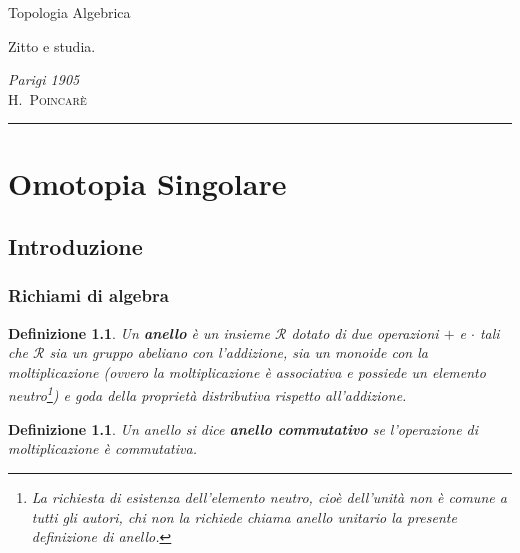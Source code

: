 \documentclass[10pt, twoside=false, x11names]{scrbook}
\newtheorem{definition}[theorem]{Definizione}
\newcommand{\R}{\mathcal{R}}
\begin{document}
\begin{titlepage}

\noindent
\titlefont Topologia Algebrica
\epigraph{Zitto e studia.}%
{\textit{Parigi 1905}\\ \textsc{H.\ Poincarè}}
\null\vfill
\vspace*{1cm}
\noindent
\hfill
\begin{minipage}{0.35\linewidth}
    \begin{flushright}
        \printauthor
    \end{flushright}
\end{minipage}
%
\begin{minipage}{0.02\linewidth}
    \rule{1pt}{125pt}
\end{minipage}
\titlepagedecoration
\end{titlepage}

\tableofcontents
\printsymblist


\chapter{Omotopia Singolare}

\section{Introduzione}

\subsection{Richiami di algebra}

\newmathsymb{R}{\R}{Anello}
\begin{definition}
  Un \textbf{anello}  è un insieme $ \R $ dotato di due operazioni $ + $ e $ \cdot $ tali che
  $ \R $ sia un gruppo abeliano con l'addizione, sia un monoide con la moltiplicazione
  (ovvero la moltiplicazione è associativa e possiede un elemento neutro\footnote{La richiesta
    di esistenza dell'elemento neutro, cioè dell'unità non è comune a tutti gli autori,
    chi non la richiede chiama anello unitario  la presente
    definizione di anello.}) e goda della proprietà distributiva rispetto all'addizione.
\end{definition}

\begin{definition}
  Un anello si dice \textbf{anello commutativo}  se l'operazione di moltiplicazione
  è commutativa.
\end{definition}
\end{document}
